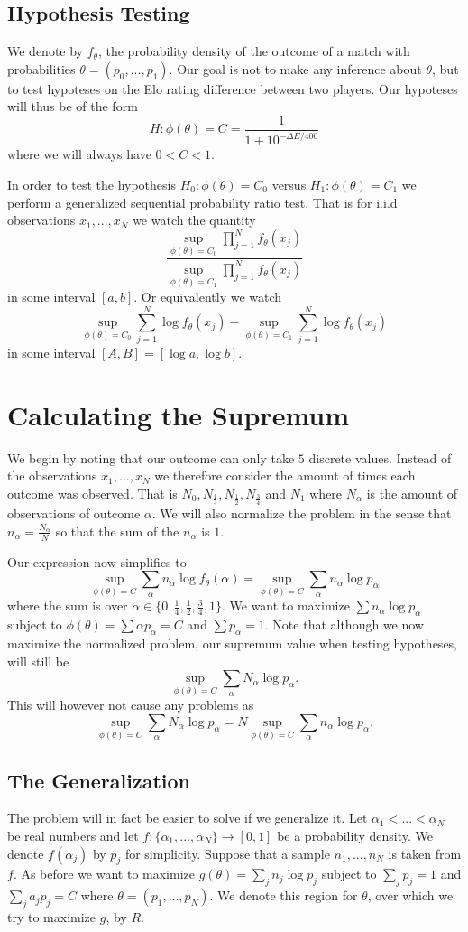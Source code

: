 \documentclass{article}
\theoremstyle{plain}
\theoremstyle{definition}
\begin{document}
\subsection{Hypothesis Testing}
We denote by $f_\theta$, the probability density of the outcome of a match with probabilities
$\theta=(p_0,...,p_1)$. Our goal is not to make any inference about $\theta$, but to test
hypoteses on the Elo rating difference between two players. Our hypoteses will thus be of
the form $$H:\phi(\theta)=C=\frac1{1+10^{-\Delta E/400}}$$ where we will always have
$0<C<1$.

In order to test the hypothesis $H_0:\phi(\theta)=C_0$ versus $H_1:\phi(\theta)=C_1$ we perform
a generalized sequential probability ratio test. That is for i.i.d observations $x_1,...,x_N$
we watch the quantity $$\frac{\sup_{\phi(\theta)=C_0}\prod_{j=1}^N f_\theta(x_j)}{\sup_{\phi(\theta)
=C_1}\prod_{j=1}^N f_\theta(x_j)}$$ in some interval $[a,b]$. Or equivalently we watch $$\sup_
{\phi(\theta)=C_0}\sum_{j=1}^N\log{f_\theta(x_j)}-\sup_{\phi(\theta)=C_1}\sum_{j=1}^N\log{f_\theta
(x_j)}$$ in some interval $[A,B]=[\log a, \log b]$.

\section{Calculating the Supremum}
We begin by noting that our outcome can only take $5$ discrete values.
Instead of the observations $x_1,...,x_N$ we therefore consider the amount of times each
outcome was observed. That is $N_0,N_\frac14,N_\frac12,N_\frac34$ and $N_1$ where
$N_\alpha$ is the amount of observations of outcome $\alpha$. We will also normalize the problem
in the sense that $n_\alpha=\frac{N_\alpha}{N}$ so that the sum of the $n_\alpha$ is $1$.

Our expression now simplifies to $$\sup_{\phi(\theta)=C}\sum_\alpha n_\alpha\log{f_\theta(\alpha)}=
\sup_{\phi(\theta)=C}\sum_\alpha n_\alpha\log{p_\alpha}$$ where the sum is over $\alpha\in
\{0,\frac14,\frac12,\frac34,1\}$. We want to maximize $\sum n_\alpha\log
{p_\alpha}$ subject to $\phi(\theta)=\sum \alpha p_\alpha=C$ and $\sum p_\alpha=1$. Note that
although we now maximize the normalized problem, our supremum value when testing hypotheses,
will still be $$\sup_{\phi(\theta)=C}\sum_\alpha N_\alpha\log{p_\alpha}.$$ This will however
not cause any problems as $$\sup_{\phi(\theta)=C}\sum_\alpha N_\alpha\log{p_\alpha}=
N\sup_{\phi(\theta)=C}\sum_\alpha n_\alpha\log{p_\alpha}.$$

\subsection{The Generalization}
The problem will in fact be easier to solve if we generalize it. Let $\alpha_1<...<\alpha_N$ be
real numbers and let $f:\{\alpha_1,...,\alpha_N\}\to [0,1]$ be a probability density. We denote
$f(\alpha_j)$ by $p_j$ for simplicity. Suppose that a sample $n_1,...,n_N$ is taken from $f$.
As before we want to maximize $g(\theta)=\sum_j n_j\log p_j$ subject to $\sum_j p_j=1$ and
$\sum_j a_jp_j=C$ where $\theta=(p_1,...,p_N)$. We denote this region for $\theta$, over which
we try to maximize $g$, by $R$.
\end{document}
